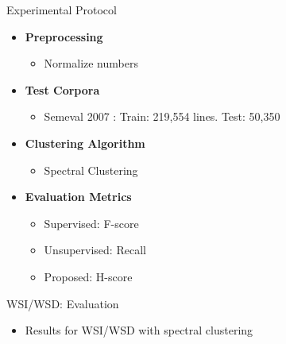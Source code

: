 \documentclass[10pt,xcolor=table]{beamer}
\begin{document}
\begin{frame}{Experimental Protocol}
	\begin{itemize}
		\item \large \textbf{Preprocessing}
			\begin{itemize}
				\item Normalize numbers
			\end{itemize}
		\item \textbf{Test Corpora}
			\begin{itemize}
			\item Semeval 2007 \cite{SangM03}: Train: 219,554 lines. Test: 50,350 
			\end{itemize}
		\item \textbf{Clustering Algorithm}
			\begin{itemize}
				\item Spectral Clustering
			\end{itemize}

		\item \textbf{Evaluation Metrics}
			\begin{itemize}
				\item Supervised: F-score
				\item Unsupervised: Recall
				\item Proposed: H-score
			\end{itemize}
	\end{itemize}	 
	\vspace{\textheight}
\end{frame}

\begin{frame}{WSI/WSD: Evaluation}
\begin{itemize}
\item Results for WSI/WSD with spectral clustering
\end{itemize}
\end{frame}
\end{document}
